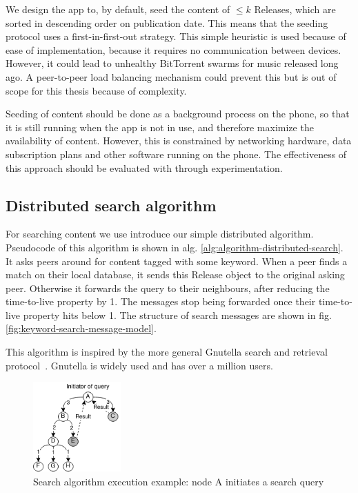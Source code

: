 We design the app to, by default, seed the content of $\leq k$ Releases, which are sorted in descending order on publication date. This means that the seeding protocol uses a first-in-first-out strategy. This simple heuristic is used because of ease of implementation, because it requires no communication between devices. However, it could lead to unhealthy BitTorrent swarms for music released long ago. A peer-to-peer load balancing mechanism could prevent this but is out of scope for this thesis because of complexity.

Seeding of content should be done as a background process on the phone, so that it is still running when the app is not in use, and therefore maximize the availability of content.  However, this is constrained by networking hardware, data subscription plans and other software running on the phone. The effectiveness of this approach should be evaluated with through experimentation.

\subsection{Distributed search algorithm}
For searching content we use introduce our simple distributed algorithm. Pseudocode of this algorithm is shown in alg. \ref{alg:algorithm-distributed-search}. It asks peers around for content tagged with some keyword. When a peer finds a match on their local database, it sends this Release object to the original asking peer. Otherwise it forwards the query to their neighbours, after reducing the time-to-live property by 1. The messages stop being forwarded once their time-to-live property hits below 1. The structure of search messages are shown in fig. \ref{fig:keyword-search-message-model}. 

This algorithm is inspired by the more general Gnutella search and retrieval protocol~\citep{kronfol2002fasd}. Gnutella is widely used and has over a million users.



\begin{figure}
    \centering
    \includegraphics[width=0.3\textwidth]{design/search-algorithm-diagram.png}
    \caption{Search algorithm execution example: node A initiates a search query}
    \label{fig:search-algorithm-diagram}
\end{figure}

